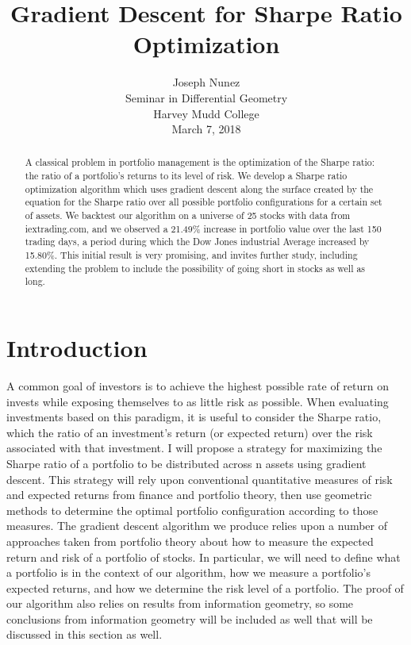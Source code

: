\documentclass{article}
\title{Gradient Descent for Sharpe Ratio Optimization}
\author{
 Joseph Nunez\\
Seminar in Differential Geometry\\
Harvey Mudd College\\ 
March 7, 2018}
\begin{document}


\maketitle


\begin{abstract}
A classical problem in portfolio management is the optimization of the Sharpe ratio: the ratio of a portfolio’s returns to its level of risk. We develop a Sharpe ratio optimization algorithm which uses gradient descent along the surface created by the equation for the Sharpe ratio over all possible portfolio configurations for a certain set of assets.
We backtest our algorithm on a universe of 25 stocks with data from iextrading.com, and we observed a 21.49\% increase in portfolio value over the last 150 trading days, a period during which the Dow Jones industrial Average increased by 15.80\%. This initial result is very promising, and invites further study, including extending the problem to include the possibility of going short in stocks as well as long.
\end{abstract}




\section{Introduction}
A common goal of investors is to achieve the highest possible rate of return on invests while exposing themselves to as little risk as possible. When evaluating investments based on this paradigm, it is useful to consider the Sharpe ratio, which the ratio of an investment’s return (or expected return) over the risk associated with that investment. I will propose a strategy for maximizing the Sharpe ratio of a portfolio to be distributed across n assets using gradient descent. This strategy will rely upon conventional quantitative measures of risk and expected returns from finance and portfolio theory, then use geometric methods to determine the optimal portfolio configuration according to those measures.
The gradient descent algorithm we produce relies upon a number of approaches taken from portfolio theory about how to measure the expected return and risk of a portfolio of stocks. In particular, we will need to define what a portfolio is in the context of our algorithm, how we measure a portfolio’s expected returns, and how we determine the risk level of a portfolio. The proof of our algorithm also relies on results from information geometry, so some conclusions from information geometry will be included as well that will be discussed in this section as well.
\end{document}
